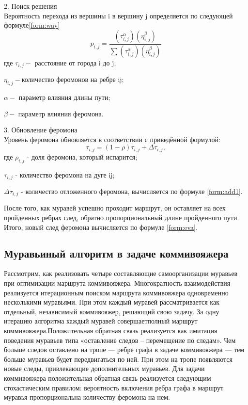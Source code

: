\documentclass[a4paper, 12pt]{article}
\begin{document}
	\hspace*{-5mm}2. Поиск решения  \\
	Вероятность перехода из вершины i в вершину j определяется по следующей формуле\ref{form:way}\\   
	\begin{equation}\label{form:way} 
		p_{i,j}={\frac {(\tau _{i,j}^{\alpha })(\eta _{i,j}^{\beta })}{\sum (\tau _{i,j}^{\alpha })(\eta _{i,j}^{\beta })}}
	\end{equation}
	где \quad$ \tau _{i,j} - $ расстояние от города i до j;
	
	$\eta _{i,j} - $количество феромонов на ребре ij;
	
	$\alpha - $ параметр влияния длины пути;
	
	$\beta - $ параметр влияния феромона.
	
	
	\hspace*{-5mm}3. Обновление феромона \\
	Уровень феромона обновляется в соответствии с приведённой формулой:\\
	\begin{equation}\label{form:eva} 
		\tau _{i,j}=(1-\rho )\tau _{i,j}+\Delta \tau _{i,j},
	\end{equation}
	где \quad$ \rho_{i,j}$ - доля феромона, который испарится; 
	
	$\tau_{i,j}$ - количество феромона на дуге ij; 
	
	$\Delta \tau_{i,j}$ - количество отложенного феромона, вычисляется по формуле \ref{form:add1}.
	
	После того, как муравей успешно проходит маршрут, он оставляет на всех пройденных ребрах след, обратно пропорциональный длине пройденного пути. Итого, новый след феромона вычисляется по формуле \ref{form:eva}.
	\subsection{Муравьиный алгоритм в задаче коммивояжера}
	\hspace*{5mm} Рассмотрим, как реализовать четыре составляющие самоорганизации муравьев при оптимизации маршрута коммивояжера. Многократность взаимодействия реализуется итерационным поиском маршрута коммивояжера одновременно несколькими муравьями. При этом каждый муравей рассматривается как отдельный, независимый коммивояжер, решающий свою задачу. За одну итерацию алгоритма каждый муравей совершаетполный маршрут коммивояжера.Положительная обратная связь реализуется как имитация поведения муравьев типа «оставление следов – перемещение по следам». Чем больше следов оставлено на тропе — ребре графа в задаче коммивояжера  — тем больше муравьев будет передвигаться по ней. При этом на тропе появляются новые следы, привлекающие дополнительных муравьев. Для задачи коммивояжера положительная обратная связь реализуется следующим стохастическим правилом: вероятность включения ребра графа в маршрут муравья пропорциональна количеству феромона на нем.
	
\end{document}
